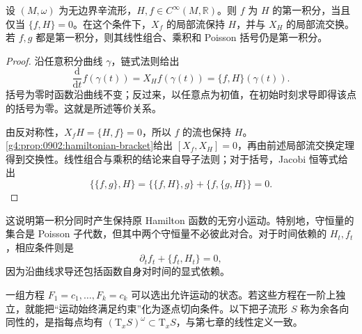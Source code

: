\begin{proposition}\label{g4:prop:0902:first-integral}
	设 \((M,\omega)\) 为无边界辛流形，\(H,f\in C^\infty(M,\mathbb R)\)。则 \(f\) 为 \(H\) 的第一积分，当且仅当 \(\{f,H\}=0\)。在这个条件下，\(X_f\) 的局部流保持 \(H\)，并与 \(X_H\) 的局部流交换。若 \(f,g\) 都是第一积分，则其线性组合、乘积和 Poisson 括号仍是第一积分。
\end{proposition}
\begin{proof}
	沿任意积分曲线 \(\gamma\)，链式法则给出
	\[
		\frac{\mathrm{d}}{\mathrm{d}t}f(\gamma(t))
		=X_Hf(\gamma(t))=\{f,H\}(\gamma(t)).
	\]
	括号为零时函数沿曲线不变；反过来，以任意点为初值，在初始时刻求导即得该点的括号为零。这就是所述等价关系。\cite[第5.5节，命题5.12，第150--151页]{Cannas2006Symplectic}

	由反对称性，\(X_fH=\{H,f\}=0\)，所以 \(f\) 的流也保持 \(H\)。\cref{g4:prop:0902:hamiltonian-bracket}给出 \([X_f,X_H]=0\)，再由前述局部流交换定理得到交换性。线性组合与乘积的结论来自导子法则；对于括号，Jacobi 恒等式给出
	\[
		\{\{f,g\},H\}
		=\{\{f,H\},g\}+\{f,\{g,H\}\}=0.
	\]
\end{proof}

这说明第一积分同时产生保持原 Hamilton 函数的无穷小运动。特别地，守恒量的集合是 Poisson 子代数，但其中两个守恒量不必彼此对合。对于时间依赖的 \(H_t,f_t\)，相应条件则是
\[
	\partial_tf_t+\{f_t,H_t\}=0,
\]
因为沿曲线求导还包括函数自身对时间的显式依赖。

\ProseParagraphBreak

一组方程 \(F_1=c_1,\ldots,F_k=c_k\) 可以选出允许运动的状态。若这些方程在一阶上独立，就能把“运动始终满足约束”化为逐点切向条件。以下把子流形 \(S\) 称为余各向同性的，是指每点均有 \((\mathrm{T}_xS)^\omega\subset\mathrm{T}_xS\)，与第七章的线性定义一致。

